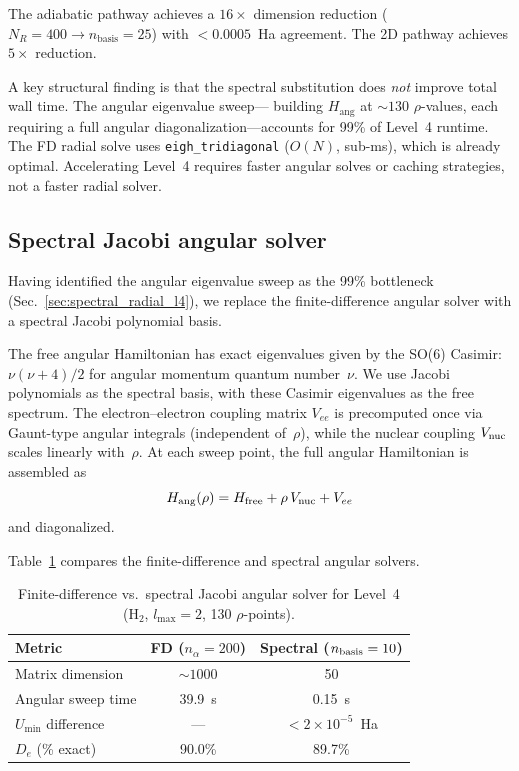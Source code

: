 \documentclass[aps,pra,twocolumn,superscriptaddress,longbibliography]{revtex4-2}
\begin{document}
The adiabatic pathway achieves a $16\times$ dimension reduction
($N_R = 400 \to n_{\mathrm{basis}} = 25$) with $< 0.0005$~Ha
agreement.  The 2D pathway achieves $5\times$ reduction.

A key structural finding is that the spectral substitution does
\emph{not} improve total wall time.  The angular eigenvalue sweep---
building $H_{\mathrm{ang}}$ at $\sim\!130$ $\rho$-values, each
requiring a full angular diagonalization---accounts for 99\% of
Level~4 runtime.  The FD radial solve uses \texttt{eigh\_tridiagonal}
($O(N)$, sub-ms), which is already optimal.  Accelerating Level~4
requires faster angular solves or caching strategies, not a faster
radial solver.

\subsection{Spectral Jacobi angular solver}
\label{sec:spectral_angular_l4}

Having identified the angular eigenvalue sweep as the 99\% bottleneck
(Sec.~\ref{sec:spectral_radial_l4}), we replace the finite-difference
angular solver with a spectral Jacobi polynomial basis.

The free angular Hamiltonian has exact eigenvalues given by the SO(6)
Casimir: $\nu(\nu+4)/2$ for angular momentum quantum number~$\nu$.
We use Jacobi polynomials as the spectral basis, with these Casimir
eigenvalues as the free spectrum.  The electron--electron coupling
matrix $V_{ee}$ is precomputed once via Gaunt-type angular integrals
(independent of~$\rho$), while the nuclear coupling $V_{\rm nuc}$
scales linearly with~$\rho$.  At each sweep point, the full angular
Hamiltonian is assembled as
\begin{equation}
  H_{\rm ang}(\rho) = H_{\rm free} + \rho \, V_{\rm nuc} + V_{ee}
\end{equation}
and diagonalized.

Table~\ref{tab:spectral_angular_l4} compares the finite-difference
and spectral angular solvers.

\begin{table}[h]
\caption{Finite-difference vs.\ spectral Jacobi angular solver for
Level~4 (H$_2$, $l_{\max} = 2$, 130 $\rho$-points).}
\label{tab:spectral_angular_l4}
\begin{ruledtabular}
\begin{tabular}{lcc}
  Metric & FD ($n_\alpha = 200$) & Spectral ($n_{\rm basis} = 10$) \\
  \hline
  Matrix dimension      & ${\sim}1000$ & 50 \\
  Angular sweep time    & 39.9~s       & 0.15~s \\
  $U_{\min}$ difference & ---          & $< 2 \times 10^{-5}$~Ha \\
  $D_e$ (\% exact)      & 90.0\%       & 89.7\% \\
\end{tabular}
\end{ruledtabular}
\end{table}
\end{document}

